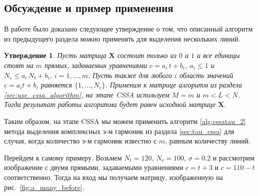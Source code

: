 \documentclass[specialist,
               substylefile = spbu.rtx,
               subf,href,colorlinks=true, 12pt]{disser}
\newtheorem{Th}{Утверждение}
\begin{document}
\subsection{Обсуждение и пример применения}
В работе \cite{Zhornikova2016} было доказано следующее утверждение о том, что описанный алгоритм из предыдущего раздела можно применять для выделения нескольких линий.

\begin{Th} \cite[Утверждение 20]{Zhornikova2016}
Пусть матрица $\mathbf{X}$ состоит только из $0$ и $1$ и все единицы стоят на $m$ прямых, задаваемых уравнениями $c = a_i\,t + b_i$,  $a_i \leqslant 1$ и $N_c \leqslant a_i\,N_t + b_i$, $i=1,\ldots,m$. Пусть также для любого $i$
область значений $c = a_i t + b_i$ равняется $\{1,\ldots,N_c\}$.
Применим к матрице алгоритм из раздела \ref{sec:use_cssa_algorithm}, на этапе CSSA используем $M = m$ и $m<L<N$. Тогда результат работы алгоритма будет равен исходной матрице $\mathbf{X}$.
\end{Th}

Таким образом, на этапе CSSA мы можем применить алгоритм \ref{alg:cssatau_2} метода выделения комплексных э-м гармоник из раздела \ref{sec:tau_cssa} для случая, когда количество э-м гармоник известно с $m$, равным количеству линий.

Перейдем к самому примеру.
Возьмем $N_t = 120$, $N_c = 100$, $\sigma = 0.2$ и рассмотрим изображение с двумя прямыми, задаваемыми уравнениями $c = t + 3$ и $c = 110 - t$ соответственно. Тогда на вход мы получаем матрицу, изображенную на рис.~\ref{fig:a_many_before}.
\end{document}

